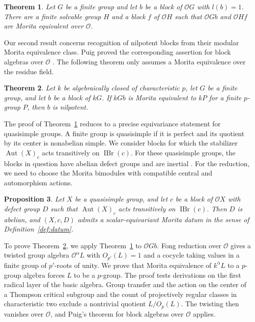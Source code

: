 \documentclass[11pt,a4paper]{article}
\newtheorem{theorem}{Theorem}[section]
\newtheorem{proposition}[theorem]{Proposition}
\theoremstyle{definition}
\theoremstyle{remark}
\numberwithin{equation}{section}
\newcommand{\cO}{\mathcal{O}}
\DeclareMathOperator{\IBr}{IBr}
\DeclareMathOperator{\Aut}{Aut}
\begin{document}
	\begin{theorem}\label{thm:solvable}
		Let $G$ be a finite group and let $b$ be a block of $\cO G$ with $l(b)=1$.
		There are a finite solvable group $H$ and a block $f$ of $\cO H$ such that $\cO Gb$ and $\cO Hf$ are Morita equivalent over $\cO$.
	\end{theorem}
	
	Our second result concerns recognition of nilpotent blocks from their modular Morita equivalence class.
	Puig proved the corresponding assertion for block algebras over $\cO$ \cite[Theorem~8.2]{Puig1999}.
	The following theorem only assumes a Morita equivalence over the residue field.
	
	\begin{theorem}\label{thm:nilpotency}
		Let $k$ be algebraically closed of characteristic $p$, let $G$ be a finite group, and let $b$ be a block of $kG$.
		If $kGb$ is Morita equivalent to $kP$ for a finite $p$-group $P$, then $b$ is nilpotent.
	\end{theorem}
	
	The proof of Theorem~\ref{thm:solvable} reduces to a precise equivariance statement for quasisimple groups.
	A finite group is quasisimple if it is perfect and its quotient by its center is nonabelian simple.
	We consider blocks for which the stabilizer $\Aut(X)_c$ acts transitively on $\IBr(c)$.
	For these quasisimple groups, the blocks in question have abelian defect groups and are inertial \cite[Propositions~1.2 and~4.1]{JiangZhangZhou2026}.
	For the reduction, we need to choose the Morita bimodules with compatible central and automorphism actions.
	
	\begin{proposition}\label{prop:local}
		Let $X$ be a quasisimple group, and let $c$ be a block of
		$\cO X$ with defect group $D$ such that $\Aut(X)_c$ acts
		transitively on $\IBr(c)$. Then $D$ is abelian, and $(X,c,D)$
		admits a scalar-equivariant Morita datum in the sense of
		Definition~\ref{def:datum}.
	\end{proposition}
	
	To prove Theorem~\ref{thm:nilpotency}, we apply Theorem~\ref{thm:solvable} to $\cO Gb$.
	Fong reduction over $\cO$ gives a twisted group algebra $\cO^\alpha L$ with $O_{p'}(L)=1$ and a cocycle taking values in a finite group of $p'$-roots of unity.
	We prove that Morita equivalence of $k^{\bar\alpha}L$ to a $p$-group algebra forces $L$ to be a $p$-group.
	The proof tests derivations on the first radical layer of the basic algebra. Group transfer and the action on the center of a Thompson critical subgroup and the count of projectively regular classes in characteristic two exclude a nontrivial quotient $L/O_p(L)$. The twisting then vanishes over $\cO$, and Puig's theorem for block algebras over $\cO$ applies.
	
\end{document}
